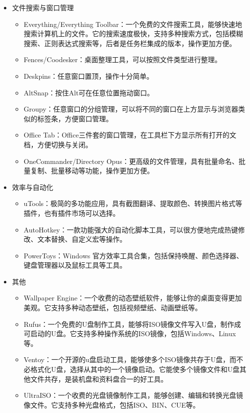 \begin{itemize}
\begin{itemize}
    \end{itemize}
  \item 文件搜索与窗口管理
    \begin{itemize}
      \item Everything/Everything Toolbar：一个免费的文件搜索工具，能够快速地搜索计算机上的文件。它的搜索速度极快，支持多种搜索方式，包括模糊搜索、正则表达式搜索等，后者是任务栏集成的版本，操作更加方便。
      \item Fences/Coodesker：桌面整理工具，可以按照文件类型进行整理。
      \item Deskpins：任意窗口置顶，操作十分简单。
      \item AltSnap：按住Alt可在任意位置拖动窗口。
      \item Groupy：任意窗口的分组管理，可以将不同的窗口在上方显示与浏览器类似的标签条，方便窗口管理。
      \item Office Tab：Office三件套的窗口管理，在工具栏下方显示所有打开的文档，方便切换与关闭。
      \item OneCommander/Directory Opus：更高级的文件管理，具有批量命名、批量复制、批量移动等功能，操作更加方便。
    \end{itemize}
  \item 效率与自动化
    \begin{itemize}
      \item uTools：极简的多功能应用，具有截图翻译、提取颜色、转换图片格式等插件，也有插件市场可以选择。
      \item AutoHotkey：一款功能强大的自动化脚本工具，可以很方便地完成热键修改、文本替换、自定义宏等操作。
      \item PowerToys：Windows 官方效率工具合集，包括保持唤醒、颜色选择器、键盘管理器以及鼠标工具等工具。
    \end{itemize}
  \item 其他
    \begin{itemize}
      \item Wallpaper Engine：一个收费的动态壁纸软件，能够让你的桌面变得更加美观。它支持多种动态壁纸，包括视频壁纸、动画壁纸等。
      \item Rufus：一个免费的U盘制作工具，能够将ISO镜像文件写入U盘，制作成可启动的U盘。它支持多种操作系统的ISO镜像，包括Windows、Linux等。
      \item Ventoy：一个开源的u盘启动工具，能够使多个ISO镜像共存于U盘，而不必格式化U盘，选择从其中的一个镜像启动。它能使多个镜像文件和U盘其他文件共存，是装机盘和资料盘合一的好工具。
      \item UltraISO：一个收费的光盘镜像制作工具，能够创建、编辑和转换光盘镜像文件。它支持多种光盘格式，包括ISO、BIN、CUE等。

\end{itemize}
\end{itemize}
